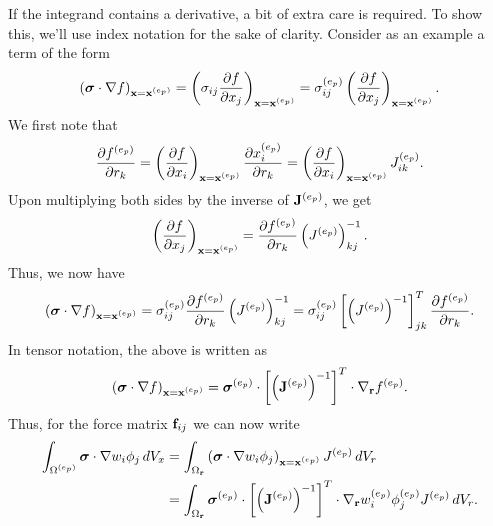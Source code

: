 \documentclass[11pt]{report}
\begin{document}
If the integrand contains a derivative, a bit of extra care is required. To show this, we'll use index notation for the sake of clarity. Consider as an example a term of the form
\begin{equation}
    \left ( \bm \sigma \cdot \nabla f \right )_{\mathbf{x}=\mathbf{x}^{(e_p)}}= \left ( \sigma_{ij} \frac{\partial f}{\partial x_j} \right )_{\mathbf{x} = \mathbf{x}^{(e_p)}}= \sigma_{ij}^{(e_p)} \left ( \frac{\partial f}{\partial x_j} \right )_{\mathbf{x} = \mathbf{x}^{(e_p)}}.
\end{equation}
We first note that
\begin{equation}
    \frac{\partial f^{(e_p)}}{\partial r_k} = \left ( \frac{\partial f}{\partial x_i} \right )_{\mathbf{x} = \mathbf{x}^{(e_p)}} \frac{\partial x^{(e_p)}_i}{\partial r_k} = \left ( \frac{\partial f}{\partial x_i} \right )_{\mathbf{x} = \mathbf{x}^{(e_p)}} J^{(e_p)}_{ik}.
\end{equation}
Upon multiplying both sides by the inverse of $\mathbf{J}^{(e_p)}$, we get
\begin{equation}
    \left ( \frac{\partial f}{\partial x_j} \right )_{\mathbf{x} = \mathbf{x}^{(e_p)}} = \frac{\partial f^{(e_p)}}{\partial r_k} \left( J^{(e_p)} \right)^{-1}_{kj}.
\end{equation}
Thus, we now have
\begin{equation}
    \left ( \bm \sigma \cdot \nabla f \right )_{\mathbf{x}=\mathbf{x}^{(e_p)}} = \sigma^{(e_p)}_{ij}\frac{\partial f^{(e_p)}}{\partial r_k} \left( J^{(e_p)} \right)^{-1}_{kj} = \sigma^{(e_p)}_{ij} \left[ \left( J^{(e_p)} \right)^{-1} \right]^T_{jk} \frac{\partial f^{(e_p)}}{\partial r_k}.
\end{equation}
In tensor notation, the above is written as
\begin{equation}
    \left ( \bm \sigma \cdot \nabla f \right )_{\mathbf{x}=\mathbf{x}^{(e_p)}} = \bm \sigma^{(e_p)} \cdot \left[ \left( \mathbf{J}^{(e_p)} \right)^{-1} \right]^T \cdot \nabla_{\mathbf{r}} f^{(e_p)}.
\end{equation}
Thus, for the force matrix $\mathbf{f}_{ij}$ we can now write
\begin{align}
    \int_{\Omega^{(e_p)}} \bm \sigma \cdot \nabla w_i \phi_j \, dV_x &= \int_{\Omega_{\mathbf{r}}} \left ( \bm \sigma \cdot \nabla w_i \phi_j \right )_{\mathbf{x}=\mathbf{x}^{(e_p)}} J^{(e_p)} \, dV_r \nonumber \\
    &= \int_{\Omega_{\mathbf{r}}} \bm \sigma^{(e_p)} \cdot \left[ \left( \mathbf{J}^{(e_p)} \right)^{-1} \right]^T  \cdot \nabla_{\mathbf{r}} w^{(e_p)}_i \phi^{(e_p)}_j J^{(e_p)} \, dV_r.
\end{align}
\end{document}
